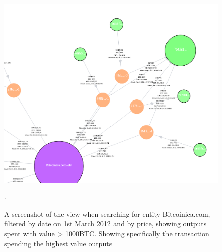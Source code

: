\begin{figure}[h!]
  \centering
  \includegraphics[width = 15cm]{./figures/theft-high-value-tx}\\[0.5cm]
  \caption{A screenshot of the view when searching for entity Bitcoinica.com, filtered by date on 1st March 2012 and by price, showing outputs spent with value > 1000BTC. Showing specifically the transaction spending the highest value outputs}.
  \label{fig:theft-highest-value-outputs}
\end{figure}